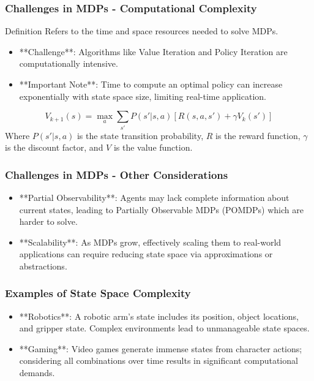 \documentclass{beamer}
\begin{document}
\begin{frame}[fragile]
    \frametitle{Challenges in MDPs - Computational Complexity}
    \begin{block}{Definition}
        Refers to the time and space resources needed to solve MDPs.
    \end{block}
    \begin{itemize}
        \item **Challenge**: Algorithms like Value Iteration and Policy Iteration are computationally intensive.
        \item **Important Note**: Time to compute an optimal policy can increase exponentially with state space size, limiting real-time application.
    \end{itemize}
    \begin{equation}
        V_{k+1}(s) = \max_a \sum_{s'} P(s'|s,a) \left[ R(s,a,s') + \gamma V_k(s') \right]
    \end{equation}
    Where \( P(s'|s,a) \) is the state transition probability, \( R \) is the reward function, \( \gamma \) is the discount factor, and \( V \) is the value function.
\end{frame}

\begin{frame}[fragile]
    \frametitle{Challenges in MDPs - Other Considerations}
    \begin{itemize}
        \item **Partial Observability**: Agents may lack complete information about current states, leading to Partially Observable MDPs (POMDPs) which are harder to solve.
        \item **Scalability**: As MDPs grow, effectively scaling them to real-world applications can require reducing state space via approximations or abstractions.
    \end{itemize}
\end{frame}

\begin{frame}[fragile]
    \frametitle{Examples of State Space Complexity}
    \begin{itemize}
        \item **Robotics**: A robotic arm's state includes its position, object locations, and gripper state. Complex environments lead to unmanageable state spaces.
        \item **Gaming**: Video games generate immense states from character actions; considering all combinations over time results in significant computational demands.
    \end{itemize}
\end{frame}
\end{document}
